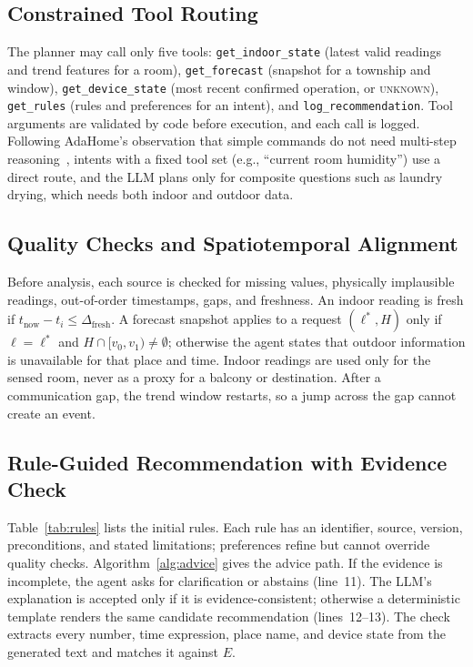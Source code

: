 \documentclass[conference]{IEEEtran}
\begin{document}
\subsection{Constrained Tool Routing}
{\sloppy
The planner may call only five tools: \texttt{get\_indoor\_state} (latest valid readings and trend features for a room), \texttt{get\_forecast} (snapshot for a township and window), \texttt{get\_device\_state} (most recent confirmed operation, or \textsc{unknown}), \texttt{get\_rules} (rules and preferences for an intent), and \texttt{log\_recommendation}. Tool arguments are validated by code before execution, and each call is logged. Following AdaHome's observation that simple commands do not need multi-step reasoning~\cite{lim2026adahome}, intents with a fixed tool set (e.g., ``current room humidity'') use a direct route, and the LLM plans only for composite questions such as laundry drying, which needs both indoor and outdoor data.\par}

\subsection{Quality Checks and Spatiotemporal Alignment}
Before analysis, each source is checked for missing values, physically implausible readings, out-of-order timestamps, gaps, and freshness. An indoor reading is fresh if $t_{\mathrm{now}}-t_i\le\Delta_{\mathrm{fresh}}$. A forecast snapshot applies to a request $(\ell^\ast, H)$ only if $\ell=\ell^\ast$ and $H\cap[v_0,v_1)\neq\emptyset$; otherwise the agent states that outdoor information is unavailable for that place and time. Indoor readings are used only for the sensed room, never as a proxy for a balcony or destination. After a communication gap, the trend window restarts, so a jump across the gap cannot create an event.

\subsection{Rule-Guided Recommendation with Evidence Check}
Table~\ref{tab:rules} lists the initial rules. Each rule has an identifier, source, version, preconditions, and stated limitations; preferences refine but cannot override quality checks. Algorithm~\ref{alg:advice} gives the advice path. If the evidence is incomplete, the agent asks for clarification or abstains (line~11). The LLM's explanation is accepted only if it is evidence-consistent; otherwise a deterministic template renders the same candidate recommendation (lines~12--13). The check extracts every number, time expression, place name, and device state from the generated text and matches it against $E$.
\end{document}
